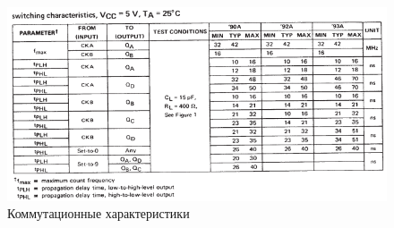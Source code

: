 \begin{figure}[H]
	\centering
	\includegraphics[width=0.95\linewidth]{imgs/12/12_switch}
	\caption{Коммутационные характеристики}
	\label{fig:12_switch}
\end{figure}